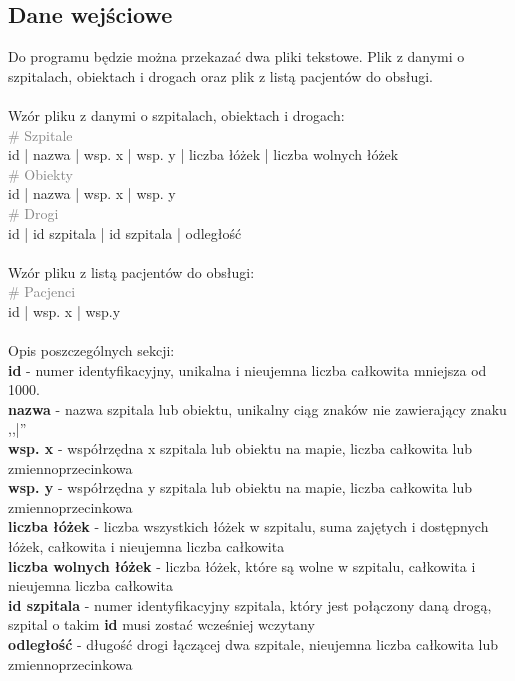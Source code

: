 \documentclass[]{article}
\begin{document}
    \subsection{Dane wejściowe}
    Do programu będzie można przekazać dwa pliki tekstowe. Plik z danymi o szpitalach, obiektach i drogach oraz plik z listą pacjentów do obsługi. \\
    \\
    Wzór pliku z danymi o szpitalach, obiektach i drogach: \\
    \textcolor{gray}{\# Szpitale} \\
    id | nazwa | wsp. x | wsp. y | liczba łóżek | liczba wolnych łóżek \\
    \textcolor{gray}{\# Obiekty} \\
    id | nazwa | wsp. x | wsp. y \\
    \textcolor{gray}{\# Drogi} \\
    id | id szpitala | id szpitala | odległość \\
    \\
    Wzór pliku z listą pacjentów do obsługi: \\
    \textcolor{gray}{\# Pacjenci} \\
    id | wsp. x | wsp.y \\
    \\
    Opis poszczególnych sekcji: \\
    \textbf{id} - numer identyfikacyjny, unikalna i nieujemna liczba całkowita mniejsza od 1000. \\
    \textbf{nazwa} - nazwa szpitala lub obiektu, unikalny ciąg znaków nie zawierający znaku ,,|'' \\
    \textbf{wsp. x} - współrzędna x szpitala lub obiektu na mapie, liczba całkowita lub zmiennoprzecinkowa \\
    \textbf{wsp. y} - współrzędna y szpitala lub obiektu na mapie, liczba całkowita lub zmiennoprzecinkowa \\
    \textbf{liczba łóżek} - liczba wszystkich łóżek w szpitalu, suma zajętych i dostępnych łóżek, całkowita i nieujemna liczba całkowita \\
    \textbf{liczba wolnych łóżek} - liczba łóżek, które są wolne w szpitalu, całkowita i nieujemna liczba całkowita \\
    \textbf{id szpitala} - numer identyfikacyjny szpitala, który jest połączony daną drogą, szpital o takim \textbf{id} musi zostać wcześniej wczytany \\
    \textbf{odległość} - długość drogi łączącej dwa szpitale, nieujemna liczba całkowita lub zmiennoprzecinkowa \\
\end{document}
